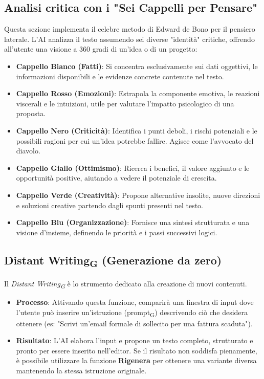 \documentclass[11pt,a4paper]{article}
\newcommand{\gls}[1]{#1\textsubscript{G}}
\begin{document}
\subsection{Analisi critica con i "Sei Cappelli per Pensare"}
Questa sezione implementa il celebre metodo di Edward de Bono per il pensiero laterale. L'AI analizza il testo assumendo sei diverse "identità" critiche, offrendo all'utente una visione a 360 gradi di un'idea o di un progetto:
\begin{itemize}
    \item \textbf{Cappello Bianco (Fatti)}: Si concentra esclusivamente sui dati oggettivi, le informazioni disponibili e le evidenze concrete contenute nel testo.
    \item \textbf{Cappello Rosso (Emozioni)}: Estrapola la componente emotiva, le reazioni viscerali e le intuizioni, utile per valutare l'impatto psicologico di una proposta.
    \item \textbf{Cappello Nero (Criticità)}: Identifica i punti deboli, i rischi potenziali e le possibili ragioni per cui un'idea potrebbe fallire. Agisce come l'avvocato del diavolo.
    \item \textbf{Cappello Giallo (Ottimismo)}: Ricerca i benefici, il valore aggiunto e le opportunità positive, aiutando a vedere il potenziale di crescita.
    \item \textbf{Cappello Verde (Creatività)}: Propone alternative insolite, nuove direzioni e soluzioni creative partendo dagli spunti presenti nel testo.
    \item \textbf{Cappello Blu (Organizzazione)}: Fornisce una sintesi strutturata e una visione d'insieme, definendo le priorità e i passi successivi logici.
\end{itemize}

\subsection{\gls{Distant Writing} (Generazione da zero)}
Il \textit{\gls{Distant Writing}} è lo strumento dedicato alla creazione di nuovi contenuti. 
\begin{itemize}
    \item \textbf{Processo}: Attivando questa funzione, comparirà una finestra di input dove l'utente può inserire un'istruzione (\gls{prompt}) descrivendo ciò che desidera ottenere (es: "Scrivi un'email formale di sollecito per una fattura scaduta").
    \item \textbf{Risultato}: L'AI elabora l'input e propone un testo completo, strutturato e pronto per essere inserito nell'editor. Se il risultato non soddisfa pienamente, è possibile utilizzare la funzione \textbf{Rigenera} per ottenere una variante diversa mantenendo la stessa istruzione originale.
\end{itemize}
\end{document}
